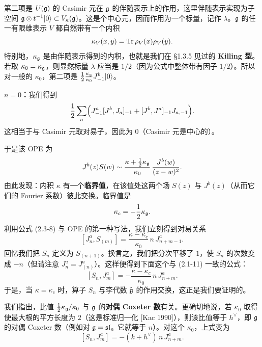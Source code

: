 第二项是 $U(\mathfrak{g})$ 的 Casimir 元在 $\mathfrak{g}$ 的伴随表示上的作用，这里伴随表示实现为子空间 $\mathfrak{g}\otimes t^{-1}|0\rangle\subset V_\kappa(\mathfrak{g})$。这是个中心元，因而作用为一个标量，记作 $\lambda$。$\mathfrak{g}$ 的任一有限维表示 $V$ 都自然带有一个内积
\[
    \kappa_V(x,y) = \operatorname{Tr} \rho_V(x)\rho_V(y).
\]
特别地，$\kappa_{\mathfrak{g}}$ 是由伴随表示得到的内积，也就是我们在 §1.3.5 见过的 \textbf{Killing 型}。若取 $\kappa_0=\kappa_{\mathfrak{g}}$，则显然标量 $\lambda$ 应当是 $1/2$（因为公式中整体带有因子 $1/2$）。所以对一般的 $\kappa_0$，第二项是 $\frac12\frac{\kappa_{\mathfrak{g}}}{\kappa_0}J^b_{-1}|0\rangle$。

\textbf{$n=0$：}我们得到
\[
    \frac12\sum_a\Bigl( J^a_{-1}[J^b,J_a]_{-1} + [J^b,J^a]_{-1}J_{a,-1}\Bigr).
\]
这相当于与 Casimir 元取对易子，因此为 $0$（Casimir 元是中心的）。

于是该 OPE 为
\[
    J^b(z)S(w) \sim \frac{\kappa+\frac12\kappa_{\mathfrak{g}}}{\kappa_0}\,
    \frac{J^b(w)}{(z-w)^2}.
\]
由此发现：内积 $\kappa$ 有一个\textbf{临界值}，在该值处这两个场 $S(z)$ 与 $J^b(z)$（从而它们的 Fourier 系数）彼此交换。临界值是
\[
    \kappa_c = -\frac12\kappa_{\mathfrak{g}} .
\]
利用公式 (2.3-8) 与 OPE 的第一种写法，我们立刻得到对易关系
\[
    [J^a_n, S_{(m)}] = \frac{\kappa-\kappa_c}{\kappa_0}\, n\, J^a_{n+m-1}.
\]
回忆我们把 $S_n$ 定义为 $S_{(n+1)}$。换言之，我们把分次平移了 $1$，使 $S_n$ 的次数变成 $-n$（但请注意 $J^a_n=J^a_{(n)}$）。这样便得到下面这个与 (2.1-11) 一致的公式：
\[
    [S_n, J^a_m] = -\frac{\kappa-\kappa_c}{\kappa_0}\, n\, J^a_{n+m}.
\]
于是，当 $\kappa=\kappa_c$ 时，算子 $S_n$ 与李代数 $\hat{\mathfrak{g}}$ 的作用交换，这正是我们要证明的。

我们指出，比值 $\frac12\kappa_{\mathfrak{g}}/\kappa_0$ 与 $\mathfrak{g}$ 的\textbf{对偶 Coxeter 数}有关。更确切地说，若 $\kappa_0$ 取得使最大根的平方长度为 $2$（这是标准归一化 [Kac 1990]），则该比值等于 $h^\vee$，即 $\mathfrak{g}$ 的对偶 Coxeter 数（例如对 $\mathfrak{g}=\mathfrak{sl}_n$ 它就等于 $n$）。对这个 $\kappa_0$，上式变为
\[
    [S_n, J^a_m] = -(k+h^\vee)\, n\, J^a_{n+m}.
\]

